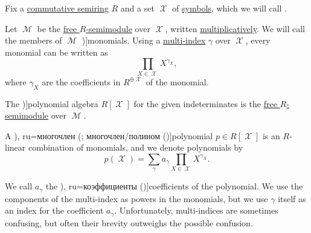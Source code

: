 \begin{definition}\label{def:polynomial_algebra}\mimprovised
  Fix a \hyperref[def:semiring/commutative]{commutative semiring} \( R \) and a set \( \mscrX \) of \hyperref[def:formal_language/symbol]{symbols}, which we will call .

  \begin{thmenum}
     Let \( \mscrM \) be the \hyperref[def:free_semimodule]{free \( R \)-semimodule} over \( \mscrX \), written \hyperref[rem:additive_semigroup]{multiplicatively}. We will call the members of \( \mscrM \) \term[ru=одночлен/моном (\cite[sec. 11.3]{Тыртышников2007})]{monomials}. Using a \hyperref[def:multi_index]{multi-index} \( \gamma \) over \( \mscrX \), every monomial can be written as
    \begin{equation*}
      \prod_{X \in \mscrX} X^{\gamma_X},
    \end{equation*}
    where \( \gamma_X \) are the coefficients in \( R^{\oplus \mscrX} \) of the monomial.

     The \term[ru=алгебра многочленов (\cite[92]{Винберг2014})]{polynomial algebra} \( R[\mscrX] \) for the given indeterminates is the \hyperref[def:free_semimodule]{free \( R \)-semimodule} over \( \mscrM \).

     A \term[bg=полином (\cite[22]{ГеновМиховскиМоллов1991}), ru=многочлен (\cite[92]{Винберг2014}; многочлен/полином (\cite[sec. 11.3]{Тыртышников2007})]{polynomial} \( p \in R[\mscrX] \) is an \( R \)-linear combination of monomials, and we denote polynomials by
    \begin{equation}\label{eq:def:polynomial_algebra/p}
      p(\mscrX) = \sum_\gamma a_\gamma \prod_{X \in \mscrX} X^{\gamma_X}.
    \end{equation}

    We call \( a_\gamma \) the \term[bg=коефициенти (\cite[22]{ГеновМиховскиМоллов1991}), ru=коэффициенты (\cite[92]{Винберг2014})]{coefficients} of the polynomial. We use the components of the multi-index as powers in the monomials, but we use \( \gamma \) itself as an index for the coefficient \( a_\gamma \). Unfortunately, multi-indices are sometimes confusing, but often their brevity outweighs the possible confusion.


\end{thmenum}
\end{definition}
